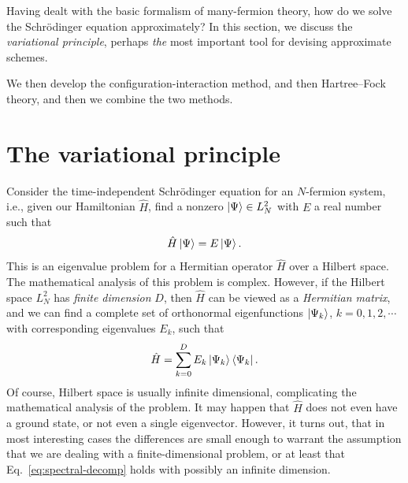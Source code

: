 \documentclass{report}
\theoremstyle{plain}
\theoremstyle{definition}
\begin{document}
Having dealt with the basic formalism of many-fermion theory,
how do we solve the Schr\"odinger equation
approximately? In this section, we discuss the \emph{variational
  principle}, perhaps \emph{the} most important tool for devising
approximate schemes.

We then develop the configuration-interaction method, and then
Hartree--Fock theory, and then we combine the two methods.

\section{The variational principle}

Consider the time-independent Schr\"odinger equation for an
$N$-fermion system, i.e., given our Hamiltonian $\hat{H}$, find a
nonzero $\ket{\Psi}\in L^2_N$ with $E$ a real number such that
\begin{equation}
  \hat{H} \ket{\Psi} = E \ket{\Psi}.
\end{equation}
This is an eigenvalue problem for a Hermitian operator $\hat{H}$ over
a Hilbert space. The mathematical analysis of this problem is
complex. However, if the Hilbert space $L^2_N$ has \emph{finite dimension} $D$, then
$\hat{H}$ can be viewed as a \emph{Hermitian matrix}, and we can find
a complete set of orthonormal eigenfunctions $\ket{\Psi_k}$,
$k=0,1,2,\cdots$ with corresponding eigenvalues $E_k$, such that
\begin{equation}
  \hat{H} = \sum_{k=0}^{D} E_k \ket{\Psi_k}\bra{\Psi_k}.\label{eq:spectral-decomp}
\end{equation}
Of course, Hilbert space is usually infinite dimensional, complicating
the mathematical analysis of the problem. It may happen that $\hat{H}$
does not even have a ground state, or not even a single
eigenvector. However, it turns out, that in most interesting cases the
differences are small enough to warrant the assumption that we are
dealing with a finite-dimensional problem, or at least that
Eq.~\eqref{eq:spectral-decomp} holds with possibly an infinite
dimension.
\end{document}
